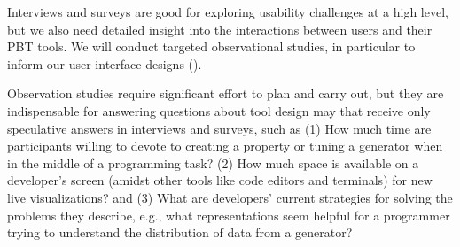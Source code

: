 
%
Interviews and surveys are good for exploring usability challenges
at a high level, but we also need detailed insight into the interactions
between users and their PBT tools.  We will
conduct targeted observational studies, in particular to inform our
user interface designs ().

Observation studies require significant effort to plan and
carry out, but they
are indispensable for answering questions about tool design may that
receive only
speculative answers in interviews and surveys, such as
(1) How much time
are participants willing to devote to
creating a property or tuning a generator when in the
middle of a programming task?
(2) How much space is available on a developer's
screen (amidst other tools like code editors and terminals) for
new live
visualizations? and
(3) What are developers' current strategies for solving the
problems they describe, e.g., what representations
seem helpful
for a programmer trying to understand the distribution of data from a
generator?

